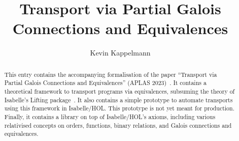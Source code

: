 \documentclass[11pt,a4paper]{report}
\begin{document}
\title{Transport via Partial Galois Connections and Equivalences}
\author{Kevin Kappelmann}
\maketitle

\begin{abstract}
This entry contains the accompanying formalisation of the paper
``Transport via Partial Galois Connections and Equivalences'' (APLAS 2023)~\cite{transport}.
It contains a theoretical framework to transport programs via equivalences,
subsuming the theory of Isabelle's Lifting package~\cite{lifting}.
It also contains a simple prototype to automate transports using this framework in Isabelle/HOL.\@
This prototype is not yet meant for production.
Finally, it contains a library on top of Isabelle/HOL's axioms,
including various relativised concepts on orders, functions, binary relations,
and Galois connections and equivalences.
\end{abstract}

\tableofcontents





\end{document}
